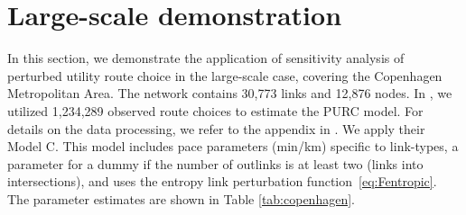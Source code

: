 \documentclass[a4paper,11pt]{article}
\begin{document}
 
\section{Large-scale demonstration}\label{sec:large_scale}

In this section, we demonstrate the application of sensitivity analysis of perturbed utility route choice in the large-scale case, covering the Copenhagen Metropolitan Area. The network contains 30,773 links and 12,876 nodes. In \cite{Fosgerau2021a}, we utilized 1,234,289 observed route choices to estimate the PURC model. For details on the data processing, we refer to the appendix in \cite{Fosgerau2021a}. We apply their Model C. This model includes pace parameters (min/km) specific to link-types, a parameter for a dummy if the number of outlinks is at least two (links into intersections), and uses the entropy link perturbation function~\eqref{eq:Fentropic}. The parameter estimates are shown in Table \ref{tab:copenhagen}.
\end{document}
